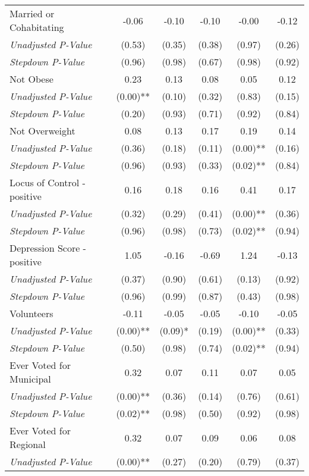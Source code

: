 \begin{tabular}{l c c c c c}
Married or Cohabitating & -0.06 & -0.10 & -0.10 & -0.00 & -0.12 \\
\quad \textit{Unadjusted P-Value} & (0.53) & (0.35) & (0.38) & (0.97) & (0.26) \\
\quad \textit{Stepdown P-Value} & (0.96) & (0.98) & (0.67) & (0.98) & (0.92) \\
Not Obese & 0.23 & 0.13 & 0.08 & 0.05 & 0.12 \\
\quad \textit{Unadjusted P-Value} & (0.00)** & (0.10) & (0.32) & (0.83) & (0.15) \\
\quad \textit{Stepdown P-Value} & (0.20) & (0.93) & (0.71) & (0.92) & (0.84) \\
Not Overweight & 0.08 & 0.13 & 0.17 & 0.19 & 0.14 \\
\quad \textit{Unadjusted P-Value} & (0.36) & (0.18) & (0.11) & (0.00)** & (0.16) \\
\quad \textit{Stepdown P-Value} & (0.96) & (0.93) & (0.33) & (0.02)** & (0.84) \\
Locus of Control - positive & 0.16 & 0.18 & 0.16 & 0.41 & 0.17 \\
\quad \textit{Unadjusted P-Value} & (0.32) & (0.29) & (0.41) & (0.00)** & (0.36) \\
\quad \textit{Stepdown P-Value} & (0.96) & (0.98) & (0.73) & (0.02)** & (0.94) \\
Depression Score - positive & 1.05 & -0.16 & -0.69 & 1.24 & -0.13 \\
\quad \textit{Unadjusted P-Value} & (0.37) & (0.90) & (0.61) & (0.13) & (0.92) \\
\quad \textit{Stepdown P-Value} & (0.96) & (0.99) & (0.87) & (0.43) & (0.98) \\
Volunteers & -0.11 & -0.05 & -0.05 & -0.10 & -0.05 \\
\quad \textit{Unadjusted P-Value} & (0.00)** & (0.09)* & (0.19) & (0.00)** & (0.33) \\
\quad \textit{Stepdown P-Value} & (0.50) & (0.98) & (0.74) & (0.02)** & (0.94) \\
Ever Voted for Municipal & 0.32 & 0.07 & 0.11 & 0.07 & 0.05 \\
\quad \textit{Unadjusted P-Value} & (0.00)** & (0.36) & (0.14) & (0.76) & (0.61) \\
\quad \textit{Stepdown P-Value} & (0.02)** & (0.98) & (0.50) & (0.92) & (0.98) \\
Ever Voted for Regional & 0.32 & 0.07 & 0.09 & 0.06 & 0.08 \\
\quad \textit{Unadjusted P-Value} & (0.00)** & (0.27) & (0.20) & (0.79) & (0.37) \\

\end{tabular}
